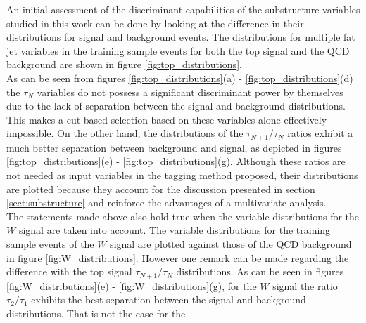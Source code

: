 \documentclass[main]{subfiles} %
\begin{document}


\doublespacing

\label{sect:results}
\vspace{20pt}

An initial assessment of the discriminant capabilities of the substructure variables studied in this work can be done by looking at the difference in their distributions for signal and background events. The distributions for multiple fat jet variables in the training sample events for both the top signal and the QCD background are shown in figure \ref{fig:top_distributions}.\\

As can be seen from figures \ref{fig:top_distributions}(a) - \ref{fig:top_distributions}(d) the $\tau_N$ variables do not possess a significant discriminant power by themselves due to the lack of separation between the signal and background distributions. This makes a cut based selection based on these variables alone effectively impossible. On the other hand, the distributions of the $\tau_{N+1}/\tau_N$ ratios exhibit a much better separation between background and signal, as depicted in figures \ref{fig:top_distributions}(e) - \ref{fig:top_distributions}(g). Although these ratios are not needed as input variables in the tagging method proposed, their distributions are plotted because they account for the discussion presented in section \ref{sect:substructure} and reinforce the advantages of a multivariate analysis. \\

The statements made above also hold true when the variable distributions for the $W$ signal are taken into account. The variable distributions for the training sample events of the $W$ signal are plotted against those of the QCD background in figure \ref{fig:W_distributions}. However one remark can be made regarding the difference with the top signal $\tau_{N+1}/\tau_N$ distributions. As can be seen in figures \ref{fig:W_distributions}(e) - \ref{fig:W_distributions}(g), for the $W$ signal the ratio $\tau_2/\tau_1$ exhibits the best separation between the signal and background distributions. That is not the case for the 
\end{document}
